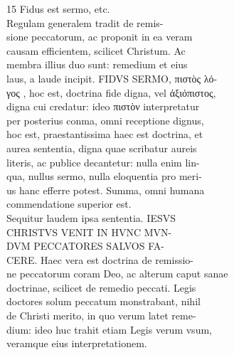 \documentclass{article}
\begin{document}
\begin{pages}
                15 Fidus est sermo, etc. \\
                Regulam generalem tradit de remis- \\
                sione peccatorum, ac proponit in ea veram \\
                causam efficientem, scilicet Christum. Ac \\
                membra illius duo sunt: remedium et eius \\
                laus, a laude incipit. FIDVS SERMO, πιστὸς λό- \\
                γος , hoc est, doctrina fide digna, vel ἀξιόπιστος, \\
                digna cui credatur: ideo πιστὸν interpretatur \\
                per posterius conma, omni receptione dignus, \\
                hoc est, praestantissima haec est doctrina, et \\
                aurea sententia, digna quae scribatur aureis \\
                literis, ac publice decantetur: nulla enim lin- \\
                qua, nullus sermo, nulla eloquentia pro meri- \\
                us hanc efferre potest. Summa, omni humana \\
                commendatione superior est. \\
                Sequitur laudem ipsa sententia. IESVS \\
                CHRISTVS VENIT IN HVNC MVN- \\
                DVM PECCATORES SALVOS FA- \\
                CERE. Haec vera est doctrina de remissio- \\
                ne peccatorum coram Deo, ac alterum caput sanae \\
                doctrinae, scilicet de remedio peccati. Legis \\
                doctores solum peccatum monstrabant, nihil \\
                de Christi merito, in quo verum latet reme- \\
                dium: ideo huc trahit etiam Legis verum vsum, \\
                veramque eius interpretationem. \\

\end{pages}
\end{document}
